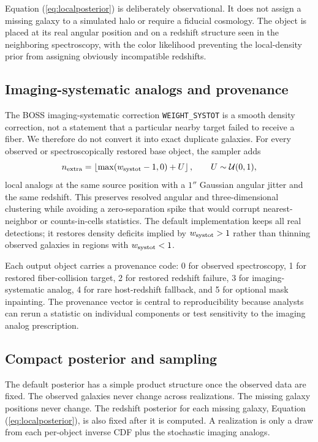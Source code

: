 \documentclass[apj]{emulateapj}
\begin{document}
Equation (\ref{eq:localposterior}) is deliberately observational.  It does not
assign a missing galaxy to a simulated halo or require a fiducial cosmology.
The object is placed at its real angular position and on a redshift structure
seen in the neighboring spectroscopy, with the color likelihood preventing the
local-density prior from assigning obviously incompatible redshifts.

\subsection{Imaging-systematic analogs and provenance}
\label{subsec:systot}

The BOSS imaging-systematic correction \texttt{WEIGHT\_SYSTOT} is a smooth
density correction, not a statement that a particular nearby target failed to
receive a fiber.  We therefore do not convert it into exact duplicate galaxies.
For every observed or spectroscopically restored base object, the sampler adds
\begin{equation}
  n_{\rm extra} =
  \left\lfloor \max(w_{\rm systot}-1,0)+U \right\rfloor,
  \qquad U\sim{\cal U}(0,1),
\end{equation}
local analogs at the same source position with a $1''$ Gaussian angular jitter
and the same redshift.  This preserves resolved angular and three-dimensional
clustering while avoiding a zero-separation spike that would corrupt
nearest-neighbor or counts-in-cells statistics.  The default implementation
keeps all real detections; it restores density deficits implied by
$w_{\rm systot}>1$ rather than thinning observed galaxies in regions with
$w_{\rm systot}<1$.

Each output object carries a provenance code: 0 for observed spectroscopy,
1 for restored fiber-collision target, 2 for restored redshift failure, 3 for
imaging-systematic analog, 4 for rare host-redshift fallback, and 5 for optional
mask inpainting.  The provenance vector is central to reproducibility because
analysts can rerun a statistic on individual components or test sensitivity to
the imaging analog prescription.

\subsection{Compact posterior and sampling}
\label{subsec:compact}

The default posterior has a simple product structure once the observed data are
fixed.  The observed galaxies never change across realizations.  The missing
galaxy positions never change.  The redshift posterior for each missing galaxy,
Equation (\ref{eq:localposterior}), is also fixed after it is computed.  A
realization is only a draw from each per-object inverse CDF plus the stochastic
imaging analogs.
\end{document}
